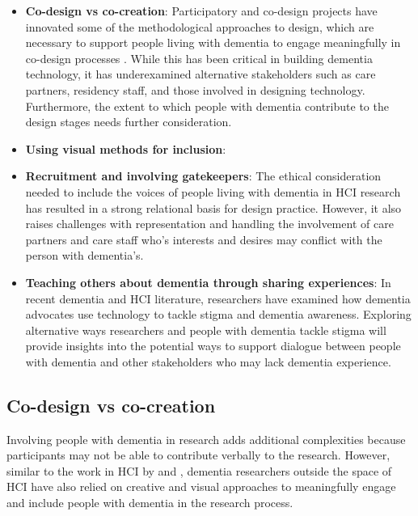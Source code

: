 \begin{itemize}
    \item \textbf{Co-design vs co-creation}: Participatory and co-design projects have innovated some of the methodological approaches to design, which are necessary to support people living with dementia to engage meaningfully in co-design processes \citep{branco_personalised_2017}. While this has been critical in building dementia technology, it has underexamined alternative stakeholders such as care partners, residency staff, and those involved in designing technology. Furthermore, the extent to which people with dementia contribute to the design stages needs further consideration.
    
    \item \textbf{Using visual methods for inclusion}: 

    \item \textbf{Recruitment and involving gatekeepers}: The ethical consideration needed to include the voices of people living with dementia in HCI research has resulted in a strong relational basis for design practice. However, it also raises challenges with representation and handling the involvement of care partners and care staff who's interests and desires may conflict with the person with dementia's. 
    
    \item \textbf{Teaching others about dementia through sharing experiences}: In recent dementia and HCI literature, researchers have examined how dementia advocates use technology to tackle stigma and dementia awareness. Exploring alternative ways researchers and people with dementia tackle stigma will provide insights into the potential ways to support dialogue between people with dementia and other stakeholders who may lack dementia experience.
\end{itemize}

\subsection{Co-design vs co-creation}
Involving people with dementia in research adds additional complexities because participants may not be able to contribute verbally to the research. However, similar to the work in HCI by \cite{lazar_using_2014} and \cite{foley_student_2020}, dementia researchers outside the space of HCI have also relied on creative and visual approaches to meaningfully engage and include people with dementia in the research process.

